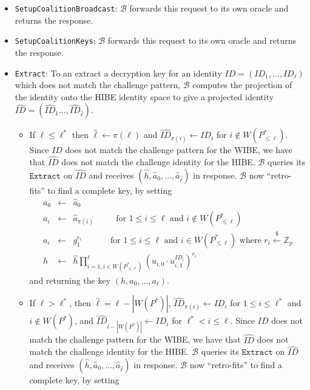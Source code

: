 \documentclass[10pt]{llncs}
\newcommand{\B}{\mathcal{B}}
\newcommand{\ID}{\mathit{ID}}
\newcommand{\getsr}{\stackrel{{\scriptscriptstyle\$}}{\gets}}
\begin{document}
\begin{enumerate}
\begin{itemize}
	\item \texttt{SetupCoalitionBroadcast}: $\B$ forwards this request to its own oracle and returns the response.
	\item \texttt{SetupCoalitionKeys}: $\B$ forwards this request to its own oracle and returns the response.
	\item \texttt{Extract}: To an extract a decryption key for an identity $\ID=(\ID_{1},\ldots,\ID_{\ell})$ which does not match the challenge pattern, $\B$ computes the projection of the identity onto the HIBE identity space to give a projected identity $\hat{\ID}=(\hat{\ID}_{1}\ldots, \hat{\ID}_{\hat{\ell}})$.
		\begin{itemize}
		\item If $\ell \leq \ell^{*}$ then $\hat{\ell} \gets \pi(\ell)$ and $\hat{\ID}_{\pi(i)} \gets \ID_{i}$ for $i\notin W(P^{*}_{\leq \ell})$. Since $\ID$ does not match the challenge pattern for the WIBE, we have that $\hat{\ID}$ does not match the challenge identity for the HIBE. $\B$ queries its $\texttt{Extract}$ on $\hat{\ID}$ and receives $(\hat{h},\hat{a}_{0},\ldots,\hat{a}_{\hat{\ell}})$ in response. $\B$ now ``retro-fits'' to find a complete key, by setting
			\begin{displaymath}
			\begin{array}{rcl}
			a_{0} &\gets& \hat{a}_{0}\\
			a_{i} &\gets& \hat{a}_{\pi(i)} \qquad \;\mbox{ for }1\leq i\leq \ell \mbox{ and } i\notin W(P^{*}_{\leq \ell})\\
			a_{i} &\gets& g_{1}^{r_{i}} \qquad \quad \mbox{ for }1\leq i\leq \ell \mbox{ and } i\in W(P^{*}_{\leq \ell})\mbox{ where } r_{i}\getsr \mathbb{Z}_{p}\\
			h &\gets& \hat{h} \prod_{i=1, i\in W(P^{*}_{\leq \ell})}^{\ell} (u_{i,0} \cdot u_{i,1}^{\ID_{i}})^{r_{i}}
			\end{array}
			\end{displaymath}
			and returning the key $(h,a_{0},\ldots,a_{\ell})$.
		\item If $\ell > \ell^{*}$, then $\hat{\ell} = \ell - |W(P^{*})|$, $\hat{\ID}_{\pi(i)} \gets \ID_{i}$ for $1\leq i\leq \ell^{*}$ and $i\notin W(P^{*})$, and $\hat{\ID}_{i-|W(P^{*})|} \gets \ID_{i}$ for $\ell^{*} < i\leq \ell$. Since $\ID$ does not match the challenge pattern for the WIBE, we have that $\hat{\ID}$ does not match the challenge identity for the HIBE. $\B$ queries its $\texttt{Extract}$ on $\hat{\ID}$ and receives $(\hat{h},\hat{a}_{0},\ldots,\hat{a}_{\hat{\ell}})$ in response. $\B$ now ``retro-fits'' to find a complete key, by setting

\end{itemize}
\end{itemize}
\end{enumerate}
\end{document}
